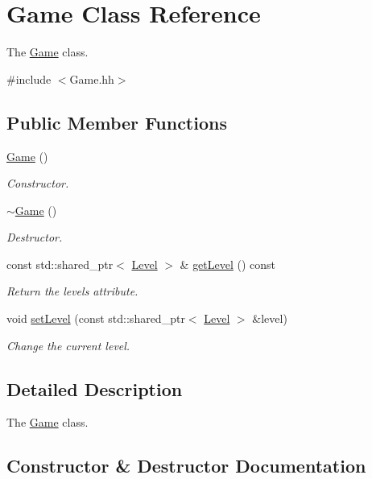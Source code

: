 \hypertarget{classGame}{}\section{Game Class Reference}
\label{classGame}


The \hyperlink{classGame}{Game} class.  




{\ttfamily \#include $<$Game.\+hh$>$}

\subsection*{Public Member Functions}
\begin{DoxyCompactItemize}
\item 
\hyperlink{classGame_ad59df6562a58a614fda24622d3715b65}{Game} ()
\begin{DoxyCompactList}\small\item\em Constructor. \end{DoxyCompactList}\item 
\hyperlink{classGame_ae3d112ca6e0e55150d2fdbc704474530}{$\sim$\+Game} ()
\begin{DoxyCompactList}\small\item\em Destructor. \end{DoxyCompactList}\item 
const std\+::shared\+\_\+ptr$<$ \hyperlink{classLevel}{Level} $>$ \& \hyperlink{classGame_aad97bed9ceadea4fcf802feaebc66947}{get\+Level} () const
\begin{DoxyCompactList}\small\item\em Return the level\textquotesingle{}s attribute. \end{DoxyCompactList}\item 
void \hyperlink{classGame_a9b3ac5684d403e8b6ecdc83f268c420f}{set\+Level} (const std\+::shared\+\_\+ptr$<$ \hyperlink{classLevel}{Level} $>$ \&level)
\begin{DoxyCompactList}\small\item\em Change the current level. \end{DoxyCompactList}\end{DoxyCompactItemize}


\subsection{Detailed Description}
The \hyperlink{classGame}{Game} class. 

\subsection{Constructor \& Destructor Documentation}
\mbox{\label{classGame_ad59df6562a58a614fda24622d3715b65}} 
